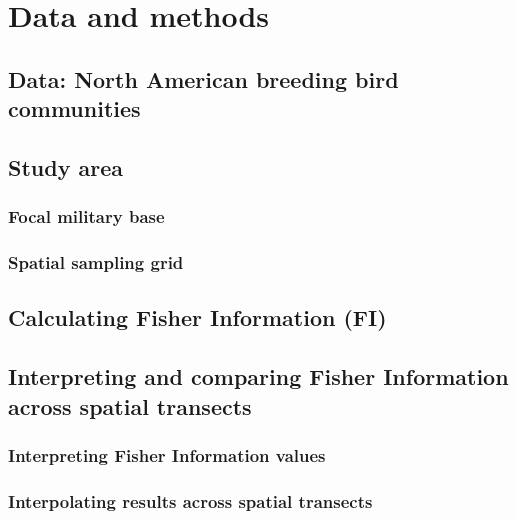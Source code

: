 \documentclass[12pt,twoside,openany]{reedthesis}
\begin{document}
\section{Data and methods}\label{data-and-methods}

\subsection{Data: North American breeding bird
communities}\label{data-north-american-breeding-bird-communities}

\subsection{Study area}\label{study-area}

\subsubsection{Focal military base}\label{focal-military-base}

\subsubsection{Spatial sampling grid}\label{spatial-sampling-grid}

\subsection{Calculating Fisher Information
(FI)}\label{calculating-fisher-information-fi}

\subsection{Interpreting and comparing Fisher Information across spatial
transects}\label{interpreting-and-comparing-fisher-information-across-spatial-transects}

\subsubsection{Interpreting Fisher Information
values}\label{interpreting-fisher-information-values}

\subsubsection{Interpolating results across spatial
transects}\label{interpolating-results-across-spatial-transects}
\end{document}
